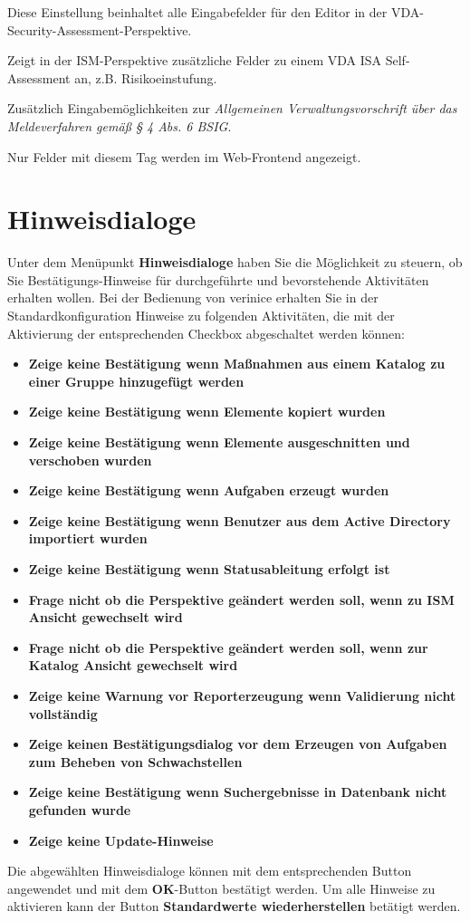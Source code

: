 \documentclass[a4paper,10pt]{book}
\newcommand*{\descrfont}[1]{\textit{#1 -}}
\begin{document}
\begin{description}[font=\normalfont\descrfont]
	\item[VDA-ISA] Diese Einstellung beinhaltet alle Eingabefelder für den Editor in der VDA-Security-Assessment-Perspektive.
	\item[VDA\_ISA\_Audit] Zeigt in der ISM-Perspektive zusätzliche Felder zu einem VDA ISA Self-Assessment an, z.B. Risikoeinstufung.
	\item[VV-BSIG] Zusätzlich Eingabemöglichkeiten zur \emph{Allgemeinen Verwaltungsvorschrift über das Meldeverfahren gemäß § 4 Abs. 6 BSIG}.
	\item[Web] Nur Felder mit diesem Tag werden im Web-Frontend angezeigt.
\end{description}

\section{Hinweisdialoge}
Unter dem Menüpunkt \textbf{Hinweisdialoge} haben Sie die Möglichkeit zu steuern, ob Sie Bestätigungs-Hinweise für durchgeführte und
bevorstehende Aktivitäten erhalten wollen. Bei der Bedienung von verinice erhalten Sie in der Standardkonfiguration Hinweise zu
folgenden Aktivitäten, die mit der Aktivierung der entsprechenden Checkbox abgeschaltet werden können:
\begin{itemize}
 \item \textbf{Zeige keine Bestätigung wenn Maßnahmen aus einem Katalog zu einer Gruppe hinzugefügt werden}
 \item \textbf{Zeige keine Bestätigung wenn Elemente kopiert wurden}
 \item \textbf{Zeige keine Bestätigung wenn Elemente ausgeschnitten und verschoben wurden}
 \item \textbf{Zeige keine Bestätigung wenn Aufgaben erzeugt wurden}
 \item \textbf{Zeige keine Bestätigung wenn Benutzer aus dem Active Directory importiert wurden}
 \item \textbf{Zeige keine Bestätigung wenn Statusableitung erfolgt ist}
 \item \textbf{Frage nicht ob die Perspektive geändert werden soll, wenn zu ISM Ansicht gewechselt wird}
 \item \textbf{Frage nicht ob die Perspektive geändert werden soll, wenn zur Katalog Ansicht gewechselt wird}
 \item \textbf{Zeige keine Warnung vor Reporterzeugung wenn Validierung nicht vollständig}
 \item \textbf{Zeige keinen Bestätigungsdialog vor dem Erzeugen von Aufgaben zum Beheben von Schwachstellen}
 \item \textbf{Zeige keine Bestätigung wenn Suchergebnisse in Datenbank nicht gefunden wurde}
 \item \textbf{Zeige keine Update-Hinweise}
\end{itemize}
Die abgewählten Hinweisdialoge können mit dem entsprechenden Button angewendet und mit dem \textbf{OK}-Button bestätigt werden.
Um alle Hinweise zu aktivieren kann der Button \textbf{Standardwerte wiederherstellen} betätigt werden.
\end{document}
